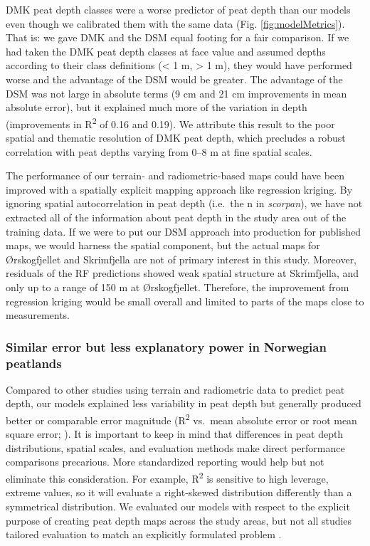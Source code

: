 \documentclass[soil, manuscript]{copernicus}
\begin{document}
DMK peat depth classes were a worse predictor of peat depth than our models even though we calibrated them with the same data (Fig. \ref{fig:modelMetrics}).
That is: we gave DMK and the DSM equal footing for a fair comparison.
If we had taken the DMK peat depth classes at face value and assumed depths according to their class definitions (\textless{} 1 m, \textgreater{} 1 m), they would have performed worse and the advantage of the DSM would be greater.
The advantage of the DSM was not large in absolute terms (9 cm and 21 cm improvements in mean absolute error), but it explained much more of the variation in depth (improvements in R\textsuperscript{2} of 0.16 and 0.19).
We attribute this result to the poor spatial and thematic resolution of DMK peat depth, which precludes a robust correlation with peat depths varying from 0--8 m at fine spatial scales.

The performance of our terrain- and radiometric-based maps could have been improved with a spatially explicit mapping approach like regression kriging.
By ignoring spatial autocorrelation in peat depth (i.e.~the n in \emph{scorpan}), we have not extracted all of the information about peat depth in the study area out of the training data.
If we were to put our DSM approach into production for published maps, we would harness the spatial component, but the actual maps for Ørskogfjellet and Skrimfjella are not of primary interest in this study.
Moreover, residuals of the RF predictions showed weak spatial structure at Skrimfjella, and only up to a range of 150 m at Ørskogfjellet.
Therefore, the improvement from regression kriging would be small overall and limited to parts of the maps close to measurements.

\subsubsection{Similar error but less explanatory power in Norwegian peatlands}

Compared to other studies using terrain and radiometric data to predict peat depth, our models explained less variability in peat depth but generally produced better or comparable error magnitude (R\textsuperscript{2} vs.~mean absolute error or root mean square error; \citet{wadouxIntegratedApproachEvaluation2022}).
It is important to keep in mind that differences in peat depth distributions, spatial scales, and evaluation methods make direct performance comparisons precarious.
More standardized reporting would help but not eliminate this consideration.
For example, R\textsuperscript{2} is sensitive to high leverage, extreme values, so it will evaluate a right-skewed distribution differently than a symmetrical distribution.
We evaluated our models with respect to the explicit purpose of creating peat depth maps across the study areas, but not all studies tailored evaluation to match an explicitly formulated problem \citep{milaNearestNeighbourDistance2022}.
\end{document}
